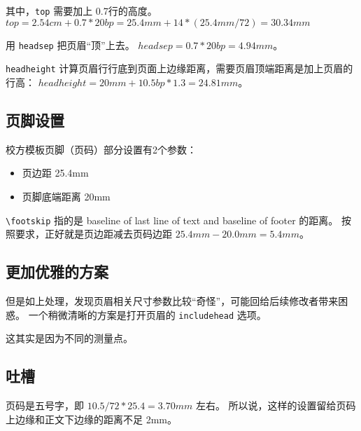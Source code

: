 \documentclass[../Main/thesis.tex]{subfiles}
\begin{document}
其中，\texttt{top} 需要加上 0.7行的高度。
\(top = 2.54cm + 0.7*20bp = 25.4mm + 14*(25.4mm/72) = 30.34mm\)

用 \texttt{headsep} 把页眉``顶''上去。 \(headsep = 0.7*20bp = 4.94mm\)。

\texttt{headheight}
计算页眉行行底到页面上边缘距离，需要页眉顶端距离是加上页眉的行高：
\(headheight = 20mm + 10.5bp*1.3 = 24.81mm\)。

\subsection{页脚设置}
校方模板页脚（页码）部分设置有2个参数：
\begin{itemize}[\textbullet]
  \item 页边距 25.4mm
  \item 页脚底端距离 20mm
\end{itemize}

\texttt{\textbackslash{}footskip} 指的是 baseline of last line of text
and baseline of footer 的距离。 按照要求，正好就是页边距减去页码边距
\(25.4mm - 20.0mm = 5.4mm\)。

\subsection{更加优雅的方案}

但是如上处理，发现页眉相关尺寸参数比较``奇怪''，可能回给后续修改者带来困惑。
一个稍微清晰的方案是打开页眉的 \texttt{includehead} 选项。

\begin{Shaded}
\begin{Highlighting}[]
\OtherTok{=}\StringTok{,}
\OtherTok{=}
\OtherTok{=}
\OtherTok{=}\StringTok{,}
\OtherTok{=}
\OtherTok{=}
\end{Highlighting}
\end{Shaded}

这其实是因为不同的测量点。

\subsection{吐槽}

页码是五号字，即 \(10.5/72*25.4 = 3.70mm\) 左右。
所以说，这样的设置留给页码上边缘和正文下边缘的距离不足 2mm。
\end{document}
